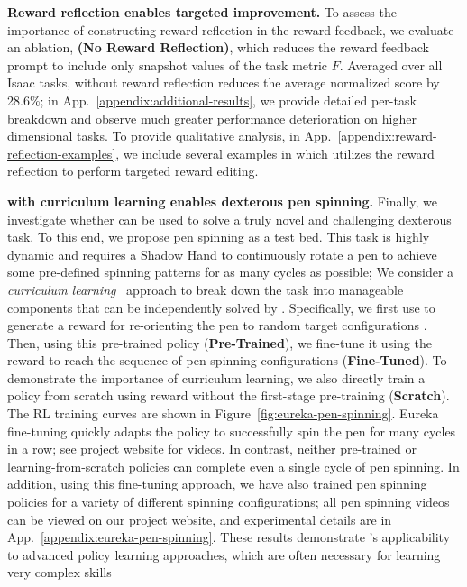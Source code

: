 \textbf{Reward reflection enables targeted improvement.} 
To assess the importance of constructing reward reflection in the reward feedback, we evaluate an ablation, \textbf{\ourmethod (No Reward Reflection)}, which reduces the reward feedback prompt to include only snapshot values of the task metric $F$. Averaged over all Isaac tasks, \ourmethod without reward reflection reduces the average normalized score by 28.6\%; in App.~\ref{appendix:additional-results}, we provide detailed per-task breakdown and observe much greater performance deterioration on higher dimensional tasks. To provide qualitative analysis, in App.~\ref{appendix:reward-reflection-examples}, we include several examples in which \ourmethod utilizes the reward reflection to perform targeted reward editing.




\textbf{\ourmethod with curriculum learning enables dexterous pen spinning.} 
Finally, we investigate whether \ourmethod can be used to solve a truly novel and challenging dexterous task. To this end, we propose pen spinning as a test bed. This task is highly dynamic and requires a Shadow Hand to continuously rotate a pen to achieve some pre-defined spinning patterns for as many cycles as possible;  We consider a \textit{curriculum learning}~\citep{bengio2009curriculum} approach to break down the task into manageable components that can be independently solved by \ourmethod. Specifically, we first use \ourmethod to generate a reward for  re-orienting the pen to random target configurations . Then, using this pre-trained policy (\textbf{Pre-Trained}), we fine-tune it using the  \ourmethod reward to reach the sequence of pen-spinning configurations (\textbf{Fine-Tuned}). To demonstrate the importance of curriculum learning, we also directly train a policy from scratch  using \ourmethod reward without the first-stage pre-training (\textbf{Scratch}). The RL training curves are shown in Figure~\ref{fig:eureka-pen-spinning}. Eureka fine-tuning quickly adapts the policy to successfully spin the pen for many cycles in a row; see project website for videos. In contrast, neither pre-trained or learning-from-scratch policies can complete even a single cycle of pen spinning. In addition, using this \ourmethod fine-tuning approach, we have also trained pen spinning policies for a variety of different spinning configurations; all pen spinning videos can be viewed on our project website, and experimental details are in App.~\ref{appendix:eureka-pen-spinning}. These results demonstrate \ourmethod's applicability to advanced policy learning approaches, which are often necessary for learning very complex skills



